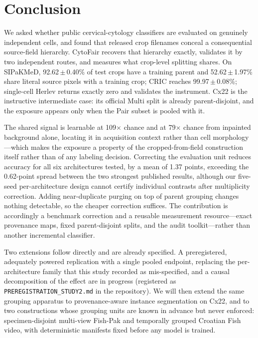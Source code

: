 \documentclass[conference]{IEEEtran}
\newcommand{\meanpm}[2]{#1\,$\pm$\,#2}
\newcommand{\cytofair}{CytoFair}
\begin{document}
\section{Conclusion}
\label{sec:conclusion}
We asked whether public cervical-cytology classifiers are evaluated on genuinely independent cells, and found that released crop filenames conceal a consequential source-field hierarchy.
\cytofair{} recovers that hierarchy exactly, validates it by two independent routes, and measures what crop-level splitting shares.
On SIPaKMeD, \meanpm{92.62}{0.40}\% of test crops have a training parent and \meanpm{52.62}{1.97}\% share literal source pixels with a training crop; CRIC reaches \meanpm{99.97}{0.08}\%; single-cell Herlev returns exactly zero and validates the instrument.
Cx22 is the instructive intermediate case: its official Multi split is already parent-disjoint, and the exposure appears only when the Pair subset is pooled with it.

The shared signal is learnable at 109$\times$ chance and at 79$\times$ chance from inpainted background alone, locating it in acquisition context rather than cell morphology---which makes the exposure a property of the cropped-from-field construction itself rather than of any labeling decision.
Correcting the evaluation unit reduces accuracy for all six architectures tested, by a mean of 1.37 points, exceeding the 0.62-point spread between the two strongest published results, although our five-seed per-architecture design cannot certify individual contrasts after multiplicity correction.
Adding near-duplicate purging on top of parent grouping changes nothing detectable, so the cheaper correction suffices.
The contribution is accordingly a benchmark correction and a reusable measurement resource---exact provenance maps, fixed parent-disjoint splits, and the audit toolkit---rather than another incremental classifier.

Two extensions follow directly and are already specified.
A preregistered, adequately powered replication with a single pooled endpoint, replacing the per-architecture family that this study recorded as mis-specified, and a causal decomposition of the effect are in progress (registered as \texttt{PREREGISTRATION\_STUDY2.md} in the repository).
We will then extend the same grouping apparatus to provenance-aware instance segmentation on Cx22, and to two constructions whose grouping units are known in advance but never enforced: specimen-disjoint multi-view Fish-Pak and temporally grouped Croatian Fish video, with deterministic manifests fixed before any model is trained.


{\scriptsize}
\end{document}
